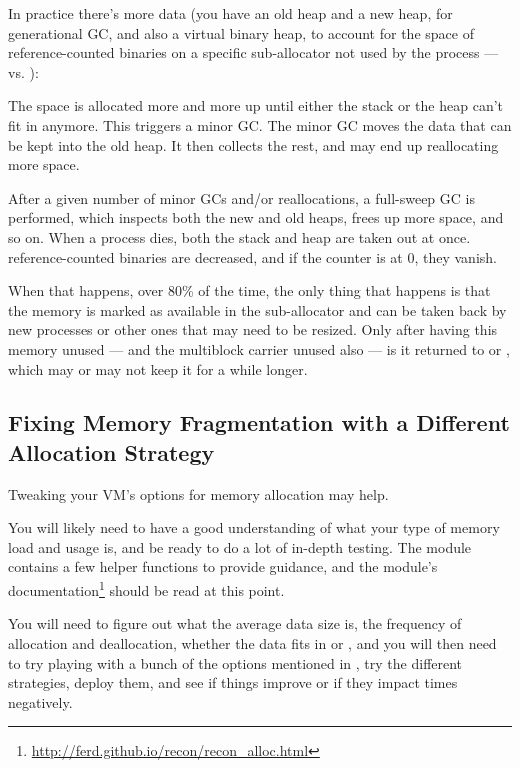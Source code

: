 \documentclass[11pt, oneside]{book}   	%
\begin{document}
In practice there's more data (you have an old heap and a new heap, for generational GC, and also a virtual binary heap, to account for the space of reference-counted binaries on a specific sub-allocator not used by the process —  vs. ):

\begin{VerbatimText}
\end{VerbatimText}

The space is allocated more and more up until either the stack or the heap can't fit in anymore. This triggers a minor GC. The minor GC moves the data that can be kept into the old heap. It then collects the rest, and may end up reallocating more space.

After a given number of minor GCs and/or reallocations, a full-sweep GC is performed, which inspects both the new and old heaps, frees up more space, and so on. When a process dies, both the stack and heap are taken out at once. reference-counted binaries are decreased, and if the counter is at 0, they vanish.

When that happens, over 80\% of the time, the only thing that happens is that the memory is marked as available in the sub-allocator and can be taken back by new processes or other ones that may need to be resized. Only after having this memory unused — and the multiblock carrier unused also — is it returned to  or , which may or may not keep it for a while longer.

\subsection{Fixing Memory Fragmentation with a Different Allocation Strategy}

Tweaking your VM's options for memory allocation may help.

You will likely need to have a good understanding of what your type of memory load and usage is, and be ready to do a lot of in-depth testing. The  module contains a few helper functions to provide guidance, and the module's documentation\footnote{\href{http://ferd.github.io/recon/recon\_alloc.html}{http://ferd.github.io/recon/recon\_alloc.html}} should be read at this point.

You will need to figure out what the average data size is, the frequency of allocation and deallocation, whether the data fits in  or ,  and you will then need to try playing with a bunch of the options mentioned in , try the different strategies, deploy them, and see if things improve or if they impact times negatively.
\end{document}
